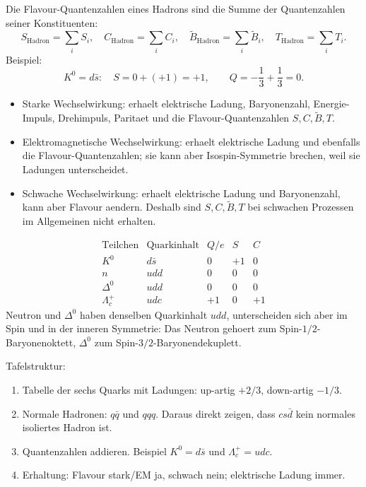 \documentclass[11pt,a4paper]{scrartcl}
\begin{document}
\begin{calculationbox}[title={(d) Additivitaet von Quantenzahlen}]
Die Flavour-Quantenzahlen eines Hadrons sind die Summe der Quantenzahlen seiner Konstituenten:
\[
S_{\mathrm{Hadron}}=\sum_i S_i,\quad C_{\mathrm{Hadron}}=\sum_i C_i,\quad \tilde B_{\mathrm{Hadron}}=\sum_i \tilde B_i,\quad T_{\mathrm{Hadron}}=\sum_i T_i.
\]
Beispiel:
\[
K^0=d\bar s: \quad S=0+(+1)=+1,\qquad Q=-\frac13+\frac13=0.
\]
\end{calculationbox}

\begin{calculationbox}[title={(e) Erhaltung in Wechselwirkungen}]
\begin{itemize}
\item Starke Wechselwirkung: erhaelt elektrische Ladung, Baryonenzahl, Energie-Impuls, Drehimpuls, Paritaet und die Flavour-Quantenzahlen \(S,C,\tilde B,T\).
\item Elektromagnetische Wechselwirkung: erhaelt elektrische Ladung und ebenfalls die Flavour-Quantenzahlen; sie kann aber Isospin-Symmetrie brechen, weil sie Ladungen unterscheidet.
\item Schwache Wechselwirkung: erhaelt elektrische Ladung und Baryonenzahl, kann aber Flavour aendern. Deshalb sind \(S,C,\tilde B,T\) bei schwachen Prozessen im Allgemeinen nicht erhalten.
\end{itemize}
\end{calculationbox}

\begin{calculationbox}[title={(f) Quarkzusammensetzungen}]
\[
\begin{array}{c|c|c|c|c}
\text{Teilchen} & \text{Quarkinhalt} & Q/e & S & C\\\hline
K^0 & d\bar s & 0 & +1 & 0\\
n & udd & 0 & 0 & 0\\
\Delta^0 & udd & 0 & 0 & 0\\
\Lambda_c^+ & udc & +1 & 0 & +1
\end{array}
\]
Neutron und \(\Delta^0\) haben denselben Quarkinhalt \(udd\), unterscheiden sich aber im Spin und in der inneren Symmetrie: Das Neutron gehoert zum Spin-\(1/2\)-Baryonenoktett, \(\Delta^0\) zum Spin-\(3/2\)-Baryonendekuplett.
\end{calculationbox}

\begin{talkbox}[title={Tafelvortrag zu Aufgabe 2}]
Tafelstruktur:
\begin{enumerate}
\item Tabelle der sechs Quarks mit Ladungen: up-artig \(+2/3\), down-artig \(-1/3\).
\item Normale Hadronen: \(q\bar q\) und \(qqq\). Daraus direkt zeigen, dass \(cs\bar d\) kein normales isoliertes Hadron ist.
\item Quantenzahlen addieren. Beispiel \(K^0=d\bar s\) und \(\Lambda_c^+=udc\).
\item Erhaltung: Flavour stark/EM ja, schwach nein; elektrische Ladung immer.
\end{enumerate}
\end{talkbox}
\end{document}
